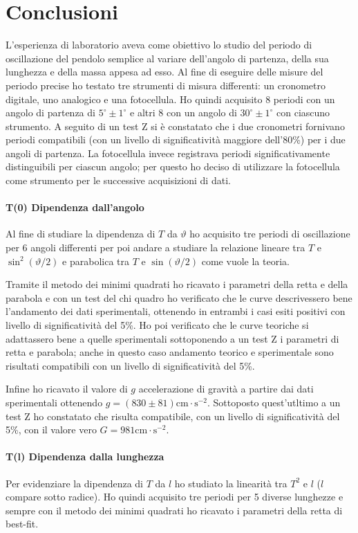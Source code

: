 \documentclass{article}
\begin{document}
	\section{Conclusioni}
	L'esperienza di laboratorio aveva come obiettivo lo studio del periodo di oscillazione del pendolo semplice al variare dell'angolo di partenza, della sua lunghezza e della massa appesa ad esso. Al fine di eseguire delle misure del periodo precise ho testato tre strumenti di misura differenti: un cronometro digitale, uno analogico e una fotocellula. Ho quindi acquisito 8 periodi con un angolo di partenza di $5^\circ \pm 1^\circ$ e altri 8 con un angolo di $30^\circ \pm 1^\circ$ con ciascuno strumento. A seguito di un test Z si è constatato che i due cronometri fornivano periodi compatibili (con un livello di significatività maggiore dell'80\%) per i due angoli di partenza. La fotocellula invece registrava periodi significativamente distinguibili per ciascun angolo; per questo ho deciso di utilizzare la fotocellula come strumento per le successive acquisizioni di dati.
	
	\paragraph{T(0) Dipendenza dall'angolo}
	Al fine di studiare la dipendenza di $T$ da $\vartheta$ ho acquisito tre periodi di oscillazione per 6 angoli differenti per poi andare a studiare la relazione lineare tra $T$ e $\sin^2(\vartheta/2)$ e parabolica tra $T$ e $\sin(\vartheta/2)$ come vuole la teoria.
	
	Tramite il metodo dei minimi quadrati ho ricavato i parametri della retta e della parabola e con un test del chi quadro ho verificato che le curve descrivessero bene l'andamento dei dati sperimentali, ottenendo in entrambi i casi esiti positivi con livello di significatività del 5\%. Ho poi verificato che le curve teoriche si adattassero bene a quelle sperimentali sottoponendo a un test Z i parametri di retta e parabola; anche in questo caso andamento teorico e sperimentale sono risultati compatibili con un livello di significatività del 5\%.
	
	Infine ho ricavato il valore di $g$ accelerazione di gravità a partire dai dati sperimentali ottenendo 	$g = (830 \pm 81)\text{cm}\cdot \text{s}^{-2}$. Sottoposto quest'utltimo a un test Z ho constatato che risulta compatibile,  con un livello di significatività del 5\%, con il valore vero $G = 981\text{cm}\cdot \text{s}^{-2}$.
	
	\paragraph{T(l) Dipendenza dalla lunghezza}	
	Per evidenziare la dipendenza di $T$ da $l$ ho studiato la linearità tra $T^2$ e $l$ ($l$ compare sotto radice). Ho quindi acquisito tre periodi per 5 diverse lunghezze e sempre con il metodo dei minimi quadrati ho ricavato i parametri della retta di best-fit. 
	
\end{document}
